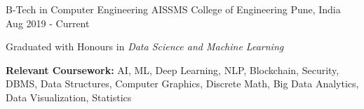 

\begin{cventries}

  \cventry
    {B-Tech in Computer Engineering} %
    {AISSMS College of Engineering} %
    {Pune, India} %
    {Aug 2019 - Current} %
    {
      \begin{cvitems} %
        \item {Graduated with Honours in \textit{Data Science and Machine Learning}\hfill{}}
        \item {\textbf{Relevant Coursework:} AI, ML, Deep Learning, NLP, Blockchain, Security, DBMS, Data Structures, Computer Graphics, Discrete Math, Big Data Analytics, Data Visualization, Statistics}
          \end{cvitems}
    }
    
\end{cventries}
